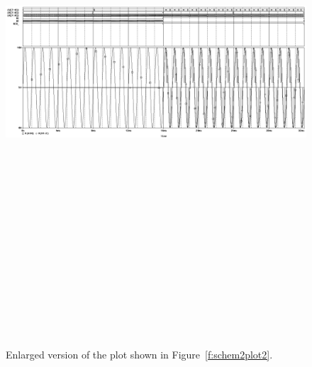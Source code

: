 \begin{figure}[H]
\centering
	\includegraphics[angle=90, height=8in]{img/shot/sim2_plot2.png}
	\parbox{.8\textwidth}{
	\caption[Part 2 Simulation Results 2 (Full Size)]{Enlarged
	version of the plot shown in Figure~\ref{f:schem2plot2}.}
	\label{f:schem2plot2_big}}
\end{figure}
